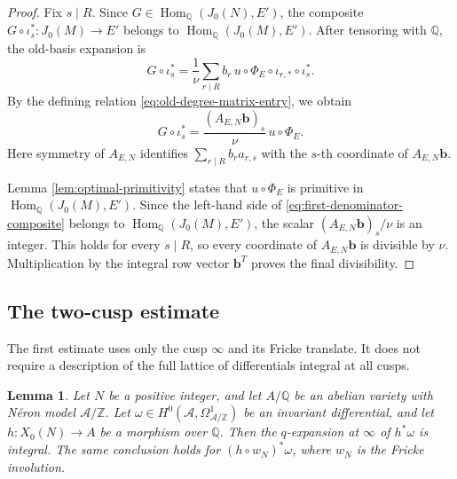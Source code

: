 \documentclass[12pt, letterpaper]{amsart}
\newtheorem{lemma}[theorem]{Lemma}
\theoremstyle{definition}
\theoremstyle{remark}
\newcommand{\Q}{\mathbb Q}
\newcommand{\Z}{\mathbb Z}
\newcommand{\Hom}{\operatorname{Hom}}
\numberwithin{equation}{section}
\begin{document}
\begin{proof}
Fix \(s\mid R\). Since \(G\in\Hom_\Q(J_0(N),E')\), the composite
\(G\circ\iota_s^{*}:J_0(M)\to E'\) belongs to
\(\Hom_\Q(J_0(M),E')\). After tensoring with \(\Q\), the old-basis expansion is
\[
        G\circ\iota_s^{*}
        =
        \frac1\nu\sum_{r\mid R}
        b_r\,u\circ\Phi_E\circ\iota_{r,*}\circ\iota_s^{*}.
\]
By the defining relation \eqref{eq:old-degree-matrix-entry}, we obtain
\begin{equation}\label{eq:first-denominator-composite}
        G\circ\iota_s^{*}
        =\frac{(A_{E,N}\boldsymbol{b})_s}{\nu}\,u\circ\Phi_E .
\end{equation}
Here symmetry of \(A_{E,N}\) identifies
\(\sum_{r\mid R}b_ra_{r,s}\) with the \(s\)-th coordinate of
\(A_{E,N}\boldsymbol{b}\).

Lemma \ref{lem:optimal-primitivity} states that \(u\circ\Phi_E\) is primitive in
\(\Hom_\Q(J_0(M),E')\). Since the left-hand side of
\eqref{eq:first-denominator-composite} belongs to
\(\Hom_\Q(J_0(M),E')\), the
scalar \((A_{E,N}\boldsymbol{b})_s/\nu\) is an integer. This holds for every
\(s\mid R\), so every coordinate of \(A_{E,N}\boldsymbol{b}\) is divisible by
\(\nu\). Multiplication by the integral row vector \(\boldsymbol{b}^{T}\)
proves the final divisibility.
\end{proof}

\subsection{The two-cusp estimate}

The first estimate uses only the cusp \(\infty\) and its Fricke translate. It
does not require a description of the full lattice of differentials integral at
all cusps.

\begin{lemma}\label{lem:q-integral}
Let \(N\) be a positive integer, and let \(A/\Q\) be an abelian variety with
N\'eron model \(\mathcal A/\Z\). Let
\(\omega\in H^0(\mathcal A,\Omega^1_{\mathcal A/\Z})\) be an invariant
differential, and let \(h:X_0(N)\to A\) be a morphism over \(\Q\). Then the
\(q\)-expansion at \(\infty\) of \(h^*\omega\) is integral. The same conclusion
holds for \((h\circ w_N)^*\omega\), where \(w_N\) is the Fricke involution.
\end{lemma}
\end{document}
